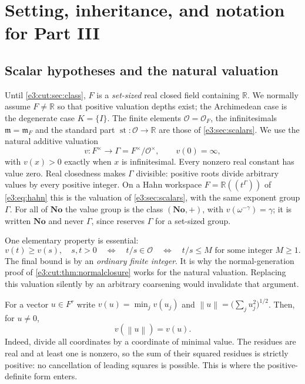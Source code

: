 \documentclass[11pt,letterpaper]{article}
\numberwithin{equation}{section}
\theoremstyle{definition}
\theoremstyle{remark}
\newcommand{\No}{\mathbf{No}}
\newcommand{\R}{\mathbb R}
\newcommand{\OO}{\mathcal O}
\newcommand{\mm}{\mathfrak m}
\newcommand{\st}{\operatorname{st}}
\newcommand{\norm}[1]{\left\lVert#1\right\rVert}
\begin{document}
\section{Setting, inheritance, and notation for Part III}\label{e3:cut:sec:setting}

\subsection{Scalar hypotheses and the natural valuation}\label{e3:cut:sub:scalars}

Until \cref{e3:cut:sec:class}, $F$ is a \emph{set-sized} real closed field
containing $\R$. We normally assume $F\ne\R$ so that positive valuation depths
exist; the Archimedean case is the degenerate case $K=\{I\}$. The finite
elements $\OO=\OO_F$, the infinitesimals $\mm=\mm_F$ and the standard part
$\st:\OO\to\R$ are those of \cref{e3:sec:scalars}. We use the natural additive
valuation
\[
 v:F^\times\longrightarrow\Gamma=F^\times/\OO^\times,\qquad v(0)=\infty,
\]
with $v(x)>0$ exactly when $x$ is infinitesimal. Every nonzero real constant has
value zero. Real closedness makes $\Gamma$ divisible: positive roots divide
arbitrary values by every positive integer. On a Hahn workspace
$F=\R((t^\Gamma))$ of \cref{e3:eq:hahn} this is the valuation of
\cref{e3:sec:scalars}, with the same exponent group $\Gamma$. For all of
$\No$ the value group is the class $(\No,+)$, with $v(\omega^{-\gamma})=\gamma$;
it is written $\No$ and never $\Gamma$, since  reserves
$\Gamma$ for a set-sized group.

One elementary property is essential:
\begin{equation}\label{e3:cut:eq:naturalratio}
 v(t)\ge v(s),\quad s,t>0
 \quad\Longleftrightarrow\quad t/s\in\OO
 \quad\Longleftrightarrow\quad t/s\le M
 \text{ for some integer }M\ge1.
\end{equation}
The final bound is by an \emph{ordinary finite integer}. It is why the
normal-generation proof of \cref{e3:cut:thm:normalclosure} works for the
natural valuation. Replacing this valuation silently by an arbitrary
coarsening would invalidate that argument.

For a vector $u\in F^r$ write $v(u)=\min_jv(u_j)$ and
$\norm u=\bigl(\sum_ju_j^2\bigr)^{1/2}$. Then, for $u\ne0$,
\begin{equation}\label{e3:cut:eq:normvalue}
 v(\norm u)=v(u).
\end{equation}
Indeed, divide all coordinates by a coordinate of minimal value. The residues
are real and at least one is nonzero, so the sum of their squared residues is
strictly positive: no cancellation of leading squares is possible. This is
where the positive-definite form enters.
\end{document}
